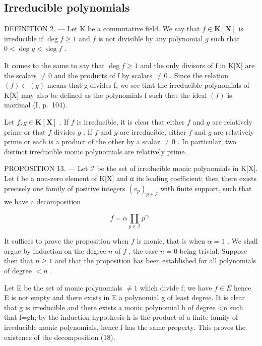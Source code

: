 \subsection{Irreducible polynomials}

DEFINITION 2. --- Let K be a commutative field. We say that \(f \in \mathbf{K}[\mathbf{X}]\) is irreducible if \(\deg f \geqslant 1\) and \(f\) is not divisible by any polynomial \(g\) such that \(0 < \deg g < \deg f\) .

It comes to the same to say that \(\deg f \geqslant 1\) and the only divisors of f in K{[}X{]} are the scalars \(\neq 0\) and the products of f by scalars \(\neq 0\) . Since the relation \((f) \subset (g)\) means that g divides f, we see that the irreducible polynomials of K{[}X{]} may also be defined as the polynomials f such that the ideal \((f)\) is maximal (I, p.~104).

Let \(f, g \in \mathbf{K}[\mathbf{X}]\) . If \(f\) is irreducible, it is clear that either \(f\) and \(g\) are relatively prime or that \(f\) divides \(g\) . If \(f\) and \(g\) are irreducible, either \(f\) and \(g\) are relatively prime or each is a product of the other by a scalar \(\neq 0\) . In particular, two distinct irreducible monic polynomials are relatively prime.

PROPOSITION 13. --- Let \(\mathcal{I}\) be the set of irreducible monic polynomials in K{[}X{]}. Let f be a non-zero element of K{[}X{]} and α its leading coefficient; then there exists precisely one family of positive integers \((v_{p})_{p\in \mathcal{I}}\) with finite support, such that we have a decomposition

\[
f = \alpha \prod_ {p \in \mathcal {I}} p ^ {v _ {p}}.\tag{18}
\]

It suffices to prove the proposition when \(f\) is monic, that is when \(\alpha = 1\) . We shall argue by induction on the degree \(n\) of \(f\) , the case \(n = 0\) being trivial. Suppose then that \(n \geqslant 1\) and that the proposition has been established for all polynomials of degree \(< n\) .

Let E be the set of monic polynomials \(\neq1\) which divide f; we have \(f\in E\) hence E is not empty and there exists in E a polynomial g of least degree. It is clear that g is irreducible and there exists a monic polynomial h of degree \textless n such that f=gh; by the induction hypothesis h is the product of a finite family of irreducible monic polynomials, hence f has the same property. This proves the existence of the decomposition (18).

